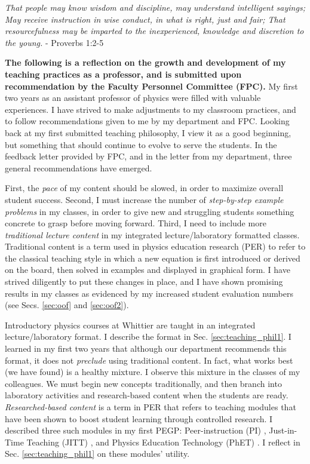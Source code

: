 \documentclass[../../main.tex]{subfiles}
\begin{document}
\epigraph{\textit{That people may know wisdom and discipline, may understand intelligent sayings; May receive instruction in wise conduct, in what is right, just and fair; That resourcefulness may be imparted to the inexperienced, knowledge and discretion to the young.} - Proverbs 1:2-5}{}

\textbf{The following is a reflection on the growth and development of my teaching practices as a professor, and is submitted upon recommendation by the Faculty Personnel Committee (FPC).}  My first two years as an assistant professor of physics were filled with valuable experiences.  I have strived to make adjustments to my classroom practices, and to follow recommendations given to me by my department and FPC.  Looking back at my first submitted teaching philosophy, I view it as a good beginning, but something that should continue to evolve to serve the students.  In the feedback letter provided by FPC, and in the letter from my department, three general recommendations have emerged. \\ \hspace{0.1cm}

First, the \textit{pace} of my content should be slowed, in order to maximize overall student success.  Second, I must increase the number of \textit{step-by-step example problems} in my classes, in order to give new and struggling students something concrete to grasp before moving forward.  Third, I need to include more \textit{traditional lecture content} in my integrated lecture/laboratory formatted classes.  Traditional content is a term used in physics education research (PER) to refer to the classical teaching style in which a new equation is first introduced or derived on the board, then solved in examples and displayed in graphical form.  I have strived diligently to put these changes in place, and I have shown promising results in my classes as evidenced by my increased student evaluation numbers (see Secs. \ref{sec:oof} and \ref{sec:oof2}). \\ \hspace{0.1cm}

Introductory physics courses at Whittier are taught in an integrated lecture/laboratory format.  I describe the format in Sec. \ref{sec:teaching_phil1}.  I learned in my first two years that although our department recommends this format, it does not \textit{preclude} using traditional content.  In fact, what works best (we have found) is a healthy mixture.  I observe this mixture in the classes of my colleagues.  We must begin new concepts traditionally, and then branch into laboratory activities and research-based content when the students are ready.  \textit{Researched-based content} is a term in PER that refers to teaching modules that have been shown to boost student learning through controlled research.  I described three such modules in my first PEGP: Peer-instruction (PI) \cite{mazur2013peer}, Just-in-Time Teaching (JITT) \cite{jitt}, and Physics Education Technology (PhET) \cite{phet}.  I reflect in Sec. \ref{sec:teaching_phil1} on these modules' utility. \\ \hspace{0.1cm}
\end{document}
